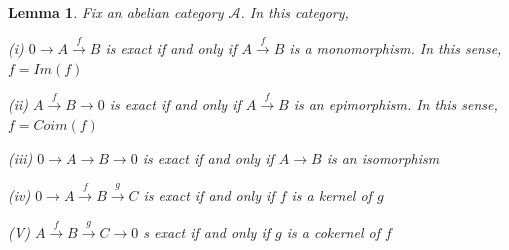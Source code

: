 \documentclass{article}
\newtheorem{lemma}[theorem]{Lemma}
\begin{document}
\begin{lemma}
Fix an abelian category $\mathscr A$. In this category,

(i) $0 \rightarrow A \xrightarrow{f} B$ is exact if and only if $A \xrightarrow{f} B$ is a monomorphism. In this sense, $f=Im(f)$

(ii) $A \xrightarrow{f} B \rightarrow 0$ is exact if and only if $A \xrightarrow{f} B$ is an epimorphism. In this sense, $f=Coim(f)$

(iii) $0 \rightarrow A \rightarrow B \rightarrow 0$ is exact if and only if $A \rightarrow B$ is an isomorphism

(iv) $0 \rightarrow A \xrightarrow{f} B \xrightarrow{g} C$ is exact if and only if $f$ is a kernel of $g$

(V) $A \xrightarrow{f} B \xrightarrow{g} C  \rightarrow 0$ s exact if and only if $g$ is a cokernel of $f$
\end{lemma}
\end{document}
